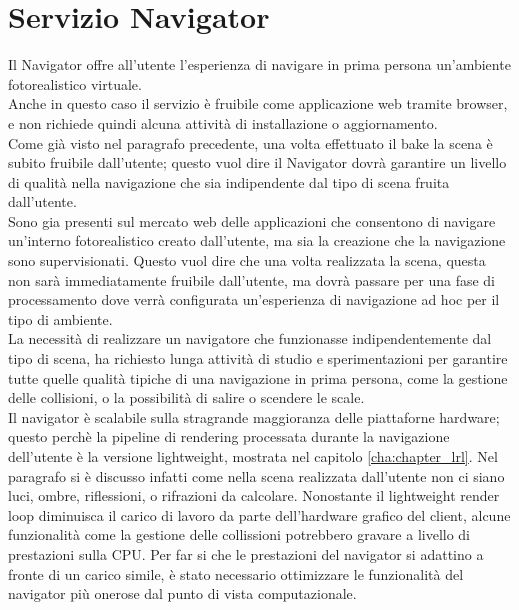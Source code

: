 \section{Servizio Navigator}
\label{sec:chapter_architettura_sistema_il_servizio_navigator}

Il Navigator offre all’utente l’esperienza di navigare in prima persona un’ambiente fotorealistico virtuale.
\\
Anche in questo caso il servizio è fruibile come applicazione web tramite browser, e non richiede quindi alcuna attività di installazione o aggiornamento.
\\
Come già visto nel paragrafo precedente, una volta effettuato il bake la scena è subito fruibile dall’utente; questo vuol dire il Navigator dovrà garantire un livello di qualità nella navigazione che sia indipendente dal tipo di scena fruita dall’utente.
\\
Sono gia presenti sul mercato web delle applicazioni che consentono di navigare un’interno fotorealistico creato dall’utente, ma sia la creazione che la navigazione sono supervisionati. Questo vuol dire che una volta realizzata la scena, questa non sarà immediatamente fruibile dall’utente, ma dovrà passare per una fase di processamento dove verrà configurata un’esperienza di navigazione ad hoc per il tipo di ambiente.
\\
La necessità di realizzare un navigatore che funzionasse indipendentemente dal tipo di scena, ha richiesto lunga attività di studio e sperimentazioni per garantire tutte quelle qualità tipiche di una navigazione in prima persona, come la gestione delle collisioni, o la possibilità di salire o scendere le scale. 
\\
Il navigator è scalabile sulla stragrande maggioranza delle piattaforne hardware; questo perchè la pipeline di rendering processata durante la navigazione dell’utente è la versione lightweight, mostrata nel capitolo \ref{cha:chapter_lrl}. Nel paragrafo si è discusso infatti come nella scena realizzata dall’utente non ci siano luci, ombre, riflessioni, o rifrazioni da calcolare. Nonostante il lightweight render loop diminuisca il carico di lavoro da parte dell’hardware grafico del client, alcune funzionalità come la gestione delle collissioni potrebbero gravare a livello di prestazioni sulla CPU. Per far si che le prestazioni del navigator si adattino a fronte di un carico simile, è stato necessario ottimizzare le funzionalità del navigator più onerose dal punto di vista computazionale.
\\
